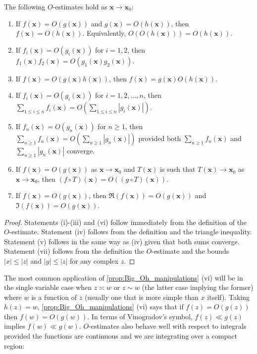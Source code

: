       \begin{proposition}\label{prop:Big_Oh_manipulations}
          The following $O$-estimates hold as $\mathbf{x} \to \mathbf{x}_{0}$:
          \begin{enumerate}[label=(\roman*)]
            \item If $f(\mathbf{x}) = O(g(\mathbf{x}))$ and $g(\mathbf{x}) = O(h(\mathbf{x}))$, then $f(\mathbf{x}) = O(h(\mathbf{x}))$. Equivalently, $O(O(h(\mathbf{x}))) = O(h(\mathbf{x}))$.
            \item If $f_{i}(\mathbf{x}) = O(g_{i}(\mathbf{x}))$ for $i = 1,2$, then $f_{1}(\mathbf{x})f_{2}(\mathbf{x}) = O(g_{1}(\mathbf{x})g_{2}(\mathbf{x}))$.
            \item If $f(\mathbf{x}) = O(g(\mathbf{x})h(\mathbf{x}))$, then $f(\mathbf{x}) = g(\mathbf{x})O(h(\mathbf{x}))$.
            \item If $f_{i}(\mathbf{x}) = O(g_{i}(\mathbf{x}))$ for $i = 1,2,\ldots,n$, then $\sum_{1 \le i \le n}f_{i}(\mathbf{x}) = O\left(\sum_{1 \le i \le n}|g_{i}(\mathbf{x})|\right)$.
            \item If $f_{n}(\mathbf{x}) = O(g_{n}(\mathbf{x}))$ for $n \ge 1$, then $\sum_{n \ge 1}f_{n}(\mathbf{x}) = O\left(\sum_{n \ge 1}|g_{n}(\mathbf{x})|\right)$ provided both $\sum_{n \ge 1}f_{n}(\mathbf{x})$ and $\sum_{n \ge 1}|g_{n}(\mathbf{x})|$ converge.
            \item If $f(\mathbf{x}) = O(g(\mathbf{x}))$ as $\mathbf{x} \to \mathbf{x}_{0}$ and $T(\mathbf{x})$ is such that $T(\mathbf{x}) \to \mathbf{x}_{0}$ as $\mathbf{x} \to \mathbf{x}_{0}$, then $(f \circ T)(\mathbf{x}) = O((g \circ T)(\mathbf{x}))$.
            \item If $f(\mathbf{x}) = O(g(\mathbf{x}))$, then $\Re(f(\mathbf{x})) = O(g(\mathbf{x}))$ and $\Im(f(\mathbf{x})) = O(g(\mathbf{x}))$.
          \end{enumerate}
      \end{proposition}
      \begin{proof}
        Statements (i)-(iii) and (vi) follow immediately from the definition of the $O$-estimate. Statement (iv) follows from the definition and the triangle inequality. Statement (v) follows in the same way as (iv) given that both sums converge. Statement (vii) follows from the definition the $O$-estimate and the bounds $|x| \le |z|$ and $|y| \le |z|$ for any complex $z$.
      \end{proof}

      The most common application of \cref{prop:Big_Oh_manipulations} (vi) will be in the single variable case when $z \asymp w$ or $z \sim w$ (the latter case implying the former) where $w$ is a function of $z$ (usually one that is more simple than $x$ itself). Taking $h(z) = w$, \cref{prop:Big_Oh_manipulations} (vi) says that if $f(z) = O(g(z))$ then $f(w) = O(g(w))$. In terms of Vinogradov's symbol, $f(z) \ll g(z)$ implies $f(w) \ll g(w)$. $O$-estimates also behave well with respect to integrals provided the functions are continuous and we are integrating over a compact region:

